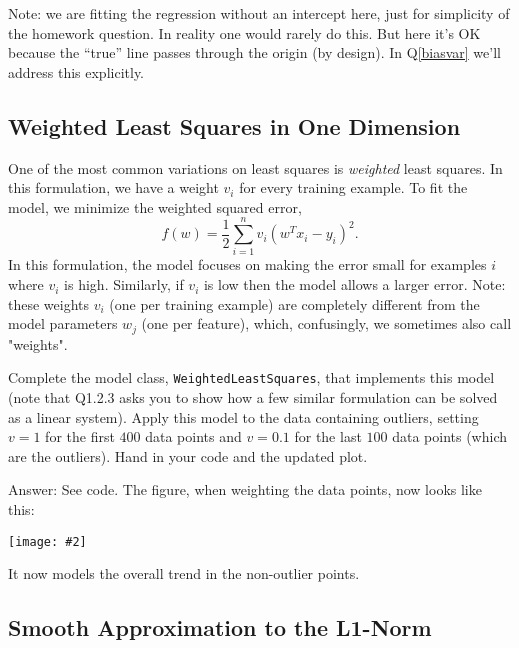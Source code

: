 \documentclass{article}
\def\ans#1{\par\gre{Answer: #1}}
\def\answer#1{\ans{#1}}
\def\blu#1{{\color{blu}#1}}
\def\gre#1{{\color{gre}#1}}
\newcommand{\centerfig}[2]{\begin{center}\texttt{[image: \#2]}\end{center}}
\begin{document}
Note: we are fitting the regression without an intercept here, just for simplicity of the homework question.
In reality one would rarely do this. But here it's OK because the ``true'' line
passes through the origin (by design). In Q\ref{biasvar} we'll address this explicitly.

\subsection{Weighted Least Squares in One Dimension}

One of the most common variations on least squares is \emph{weighted} least squares. In this formulation, we have a weight $v_i$ for every training example. To fit the model, we minimize the weighted squared error,
\[
f(w) =  \frac{1}{2}\sum_{i=1}^n v_i(w^Tx_i - y_i)^2.
\]
In this formulation, the model focuses on making the error small for examples $i$ where $v_i$ is high. Similarly, if $v_i$ is low then the model allows a larger error. Note: these weights $v_i$ (one per training example) are completely different from the model parameters $w_j$ (one per feature), which, confusingly, we sometimes also call "weights".

Complete the model class, \texttt{WeightedLeastSquares}, that implements this model
(note that Q1.2.3 asks you to show how a few similar formulation can be solved as a linear system).
Apply this model to the data containing outliers, setting $v = 1$ for the first
$400$ data points and $v = 0.1$ for the last $100$ data points (which are the outliers).
\blu{Hand in your code and the updated plot}.

\answer{
See code. The figure, when weighting the data points, now looks like this:\\
\centerfig{.7}{../figs/least_squares_outliers_weighted.pdf}
It now models the overall trend in the non-outlier points.
}

\subsection{Smooth Approximation to the L1-Norm}
\end{document}
